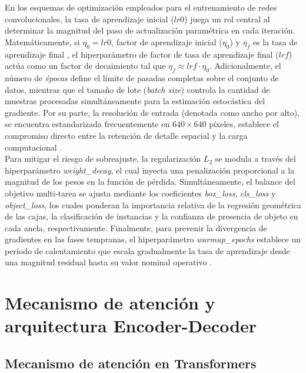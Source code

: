 En los esquemas de optimización empleados para el entrenamiento de redes convolucionales, la tasa de aprendizaje inicial ($lr0$) juega un rol central al determinar la magnitud del paso de actualización paramétrica en cada iteración. Matemáticamente, si $\eta_0 = lr0$, factor de aprendizaje inicial ($\eta_0$) y $\eta_f$ es la tasa de aprendizaje final , el hiperparámetro de factor de tasa de aprendizaje final ($lrf$) actúa como un factor de decaimiento tal que $\eta_f \approx lrf \cdot \eta_0$. Adicionalmente, el número de \textit{épocas} define el límite de pasadas completas sobre el conjunto de datos, mientras que el tamaño de lote (\textit{batch size}) controla la cantidad de muestras procesadas simultáneamente para la estimación estocástica del gradiente. Por su parte, la resolución de entrada (denotada como ancho por alto), se encuentra estandarizada frecuentemente en $640 \times 640$ píxeles, establece el compromiso directo entre la retención de detalle espacial y la carga computacional \cite{ultralyticsHyperparameterTuning}. \\

Para mitigar el riesgo de sobreajuste, la regularización $L_2$ se modula a través del hiperparámetro \textit{weight\_decay}, el cual inyecta una penalización proporcional a la magnitud de los pesos en la función de pérdida. Simultáneamente, el balance del objetivo multi-tarea se ajusta mediante los coeficientes \textit{box\_loss}, \textit{cls\_loss} y \textit{object\_loss}, los cuales ponderan la importancia relativa de la regresión geométrica de las cajas, la clasificación de instancias y la confianza de presencia de objeto en cada ancla, respectivamente. Finalmente, para prevenir la divergencia de gradientes en las fases tempranas, el hiperparámetro \textit{warmup\_epochs} establece un período de calentamiento que escala gradualmente la tasa de aprendizaje desde una magnitud residual hasta su valor nominal operativo \cite{ultralyticsHyperparameterTuning}.



\clearpage
\section{Mecanismo de atención y arquitectura Encoder-Decoder}

\subsection{Mecanismo de atención en Transformers}

